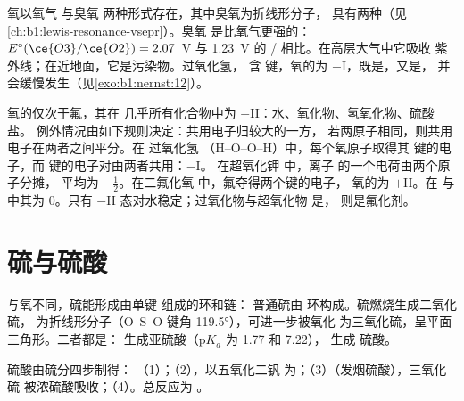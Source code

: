 氧以氧气  与臭氧  两种形式存在，其中臭氧为折线形分子，
具有两种（见\cref{ch:b1:lewis-resonance-vsepr}）。臭氧
是比氧气更强的：$E^\circ(\ce{O3}/\ce{O2}) = 2.07$~V
与 1.23~V 的 / 相比。在高层大气中它吸收
紫外线；在近地面，它是污染物。过氧化氢，
含  键，氧的为 $-$I，既是，又是，
并会缓慢发生（见\cref{exo:b1:nernst:12}）。

\begin{example}[氧的氧化数]
氧的仅次于氟，其在
几乎所有化合物中为 $-$II：水、氧化物、氢氧化物、硫酸盐。
例外情况由如下规则决定：共用电子归较大的一方，
若两原子相同，则共用电子在两者之间平分。在
过氧化氢 （H--O--O--H）中，每个氧原子取得其
 键的电子，而  键的电子对由两者共用：$-$I。
在超氧化钾  中，离子  的一个电荷由两个原子分摊，
平均为 $-\frac12$。在二氟化氧  中，氟夺得两个键的电子，
氧的为 $+$II。在  与  中其为 0。只有
$-$II 态对水稳定；过氧化物与超氧化物
是， 则是氟化剂。
\end{example}

\section{硫与硫酸}

与氧不同，硫能形成由单键  组成的环和链：
普通硫由  环构成。硫燃烧生成二氧化硫，
为折线形分子（O--S--O 键角 \ang{119.5}），可进一步被氧化
为三氧化硫，呈平面三角形。二者都是：
生成亚硫酸（$\mathrm{p}K_a$ 为 1.77 和 7.22）， 生成
硫酸。

\begin{proposition}[接触法的步骤]\label{prop:b1:p-block-16-18:contact-steps}
硫酸由硫分四步制得：
（1）；（2），以五氧化二钒
为；（3）（发烟硫酸），三氧化硫
被浓硫酸吸收；（4）。总反应为
。
\end{proposition}

